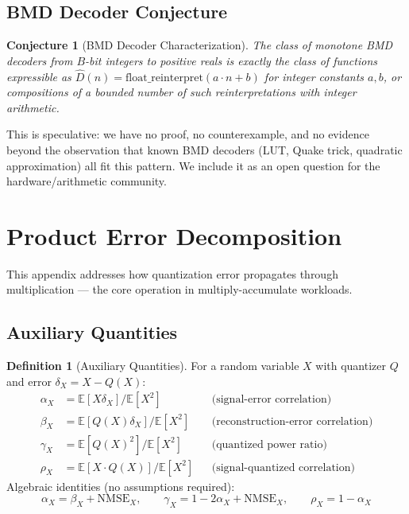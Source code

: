 \documentclass[11pt,letterpaper]{article}
\newtheorem{conjecture}[theorem]{Conjecture}
\theoremstyle{definition}
\newtheorem{definition}[theorem]{Definition}
\theoremstyle{remark}
\newcommand{\NMSE}{\mathrm{NMSE}}
\newcommand{\E}{\mathbb{E}}
\begin{document}
\subsection{BMD Decoder Conjecture}

\begin{conjecture}[BMD Decoder Characterization]
\label{conj:bmd}
The class of monotone BMD decoders from $B$-bit integers to positive reals is
exactly the class of functions expressible as
$\hat{D}(n) = \mathrm{float\_reinterpret}(a \cdot n + b)$ for integer constants
$a, b$, or compositions of a bounded number of such reinterpretations with
integer arithmetic.
\end{conjecture}

This is speculative: we have no proof, no counterexample, and no evidence beyond
the observation that known BMD decoders (LUT, Quake trick, quadratic
approximation) all fit this pattern.
We include it as an open question for the hardware/arithmetic community.


\appendix


\section{Product Error Decomposition}
\label{sec:appendix-product}

This appendix addresses how quantization error propagates through
multiplication --- the core operation in multiply-accumulate workloads.

\subsection{Auxiliary Quantities}

\begin{definition}[Auxiliary Quantities]
\label{def:auxiliary}
For a random variable $X$ with quantizer $Q$ and error $\delta_X = X - Q(X)$:
\begin{align}
  \alpha_X &= \E[X\delta_X]/\E[X^2]
    & &\text{(signal-error correlation)} \\
  \beta_X &= \E[Q(X)\delta_X]/\E[X^2]
    & &\text{(reconstruction-error correlation)} \\
  \gamma_X &= \E[Q(X)^2]/\E[X^2]
    & &\text{(quantized power ratio)} \\
  \rho_X &= \E[X \cdot Q(X)]/\E[X^2]
    & &\text{(signal-quantized correlation)}
\end{align}
Algebraic identities (no assumptions required):
\begin{equation}
  \alpha_X = \beta_X + \NMSE_X, \qquad
  \gamma_X = 1 - 2\alpha_X + \NMSE_X, \qquad
  \rho_X = 1 - \alpha_X
  \label{eq:algebraic-id}
\end{equation}
\end{definition}
\end{document}
